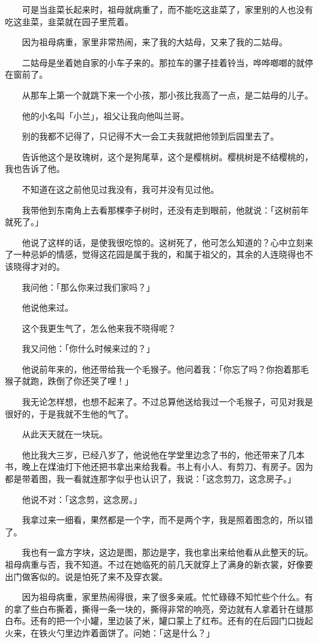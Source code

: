 \documentclass[UTF8]{ctexart}
\begin{document}
　　可是当韭菜长起来时，祖母就病重了，而不能吃这韭菜了，家里别的人也没有吃这韭菜，韭菜就在园子里荒着。

　　因为祖母病重，家里非常热闹，来了我的大姑母，又来了我的二姑母。

　　二姑母是坐着她自家的小车子来的。那拉车的骡子挂着铃当，哗哗啷啷的就停在窗前了。

　　从那车上第一个就跳下来一个小孩，那小孩比我高了一点，是二姑母的儿子。

　　他的小名叫「小兰」，祖父让我向他叫兰哥。

　　别的我都不记得了，只记得不大一会工夫我就把他领到后园里去了。

　　告诉他这个是玫瑰树，这个是狗尾草，这个是樱桃树。樱桃树是不结樱桃的，我也告诉了他。

　　不知道在这之前他见过我没有，我可并没有见过他。

　　我带他到东南角上去看那棵李子树时，还没有走到眼前，他就说：「这树前年就死了。」

　　他说了这样的话，是使我很吃惊的。这树死了，他可怎么知道的？心中立刻来了一种忌妒的情感，觉得这花园是属于我的，和属于祖父的，其余的人连晓得也不该晓得才对的。

　　我问他：「那么你来过我们家吗？」

　　他说他来过。

　　这个我更生气了，怎么他来我不晓得呢？

　　我又问他：「你什么时候来过的？」

　　他说前年来的，他还带给我一个毛猴子。他问着我：「你忘了吗？你抱着那毛猴子就跑，跌倒了你还哭了哩！」

　　我无论怎样想，也想不起来了。不过总算他送给我过一个毛猴子，可见对我是很好的，于是我就不生他的气了。

　　从此天天就在一块玩。

　　他比我大三岁，已经八岁了，他说他在学堂里边念了书的，他还带来了几本书，晚上在煤油灯下他还把书拿出来给我看。书上有小人、有剪刀、有房子。因为都是带着图，我一看就连那字似乎也认识了，我说：「这念剪刀，这念房子。」

　　他说不对：「这念剪，这念房。」

　　我拿过来一细看，果然都是一个字，而不是两个字，我是照着图念的，所以错了。

　　我也有一盒方字块，这边是图，那边是字，我也拿出来给他看从此整天的玩。祖母病重与否，我不知道。不过在她临死的前几天就穿上了满身的新衣裳，好像要出门做客似的。说是怕死了来不及穿衣裳。

　　因为祖母病重，家里热闹得很，来了很多亲戚。忙忙碌碌不知忙些个什么。有的拿了些白布撕着，撕得一条一块的，撕得非常的响亮，旁边就有人拿着针在缝那白布。还有的把一个小罐，里边装了米，罐口蒙上了红布。还有的在后园门口拢起火来，在铁火勺里边炸着面饼了。问她：「这是什么？」
\end{document}
